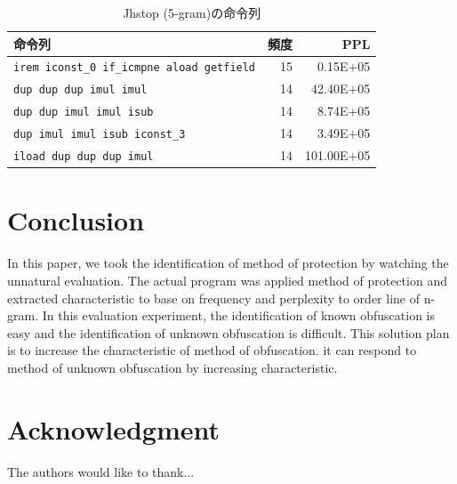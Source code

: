 \documentclass[conference]{IEEEtran}
\begin{document}
\begin{table}[t]
  \centering
  \footnotesize{
    \caption{Jhstop (5-gram)の命令列}\label{table:jhstop}
  \begin{tabular}{l|r|r}
   命令列 & 頻度 & PPL\\ \hline
    \texttt{irem iconst\_0 if\_icmpne aload getfield} & 15 &   0.15E+05 \\
    \texttt{dup dup dup imul imul}                    & 14 &  42.40E+05 \\
    \texttt{dup dup imul imul isub}                   & 14 &   8.74E+05 \\
    \texttt{dup imul imul isub iconst\_3}             & 14 &   3.49E+05 \\
    \texttt{iload dup dup dup imul}                   & 14 & 101.00E+05 \\
    \end{tabular}}
\end{table}


\section{Conclusion}
In this paper, we took the identification of method of protection by watching the unnatural evaluation.
The actual program was applied method of protection and extracted characteristic to base on frequency and perplexity to order line of n-gram.
In this evaluation experiment, the identification of known obfuscation is easy and the identification of unknown obfuscation is difficult.
This solution plan is to increase the characteristic of method of obfuscation.
it can respond to method of unknown obfuscation by increasing characteristic. 




\section*{Acknowledgment}


The authors would like to thank...





\end{document}
